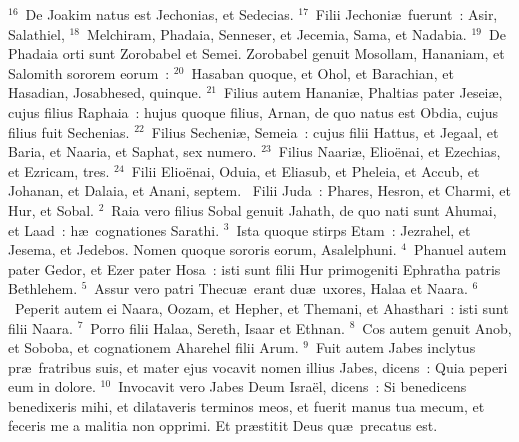 ${}^{16}$~De Joakim natus est Jechonias, et Sedecias.
${}^{17}$~Filii Jechoni\ae\ fuerunt~: Asir, Salathiel,
${}^{18}$~Melchiram, Phadaia, Senneser, et Jecemia, Sama, et Nadabia.
${}^{19}$~De Phadaia orti sunt Zorobabel et Semei. Zorobabel genuit Mosollam, Hananiam, et Salomith sororem eorum~:
${}^{20}$~Hasaban quoque, et Ohol, et Barachian, et Hasadian, Josabhesed, quinque.
${}^{21}$~Filius autem Hanani\ae , Phaltias pater Jesei\ae , cujus filius Raphaia~: hujus quoque filius, Arnan, de quo natus est Obdia, cujus filius fuit Sechenias.
${}^{22}$~Filius Secheni\ae , Semeia~: cujus filii Hattus, et Jegaal, et Baria, et Naaria, et Saphat, sex numero.
${}^{23}$~Filius Naari\ae , Elio\"enai, et Ezechias, et Ezricam, tres.
${}^{24}$~Filii Elio\"enai, Oduia, et Eliasub, et Pheleia, et Accub, et Johanan, et Dalaia, et Anani, septem.
~Filii Juda~: Phares, Hesron, et Charmi, et Hur, et Sobal.
${}^{2}$~Raia vero filius Sobal genuit Jahath, de quo nati sunt Ahumai, et Laad~: h\ae\ cognationes Sarathi.
${}^{3}$~Ista quoque stirps Etam~: Jezrahel, et Jesema, et Jedebos. Nomen quoque sororis eorum, Asalelphuni.
${}^{4}$~Phanuel autem pater Gedor, et Ezer pater Hosa~: isti sunt filii Hur primogeniti Ephratha patris Bethlehem.
${}^{5}$~Assur vero patri Thecu\ae\ erant du\ae\ uxores, Halaa et Naara.
${}^{6}$~Peperit autem ei Naara, Oozam, et Hepher, et Themani, et Ahasthari~: isti sunt filii Naara.
${}^{7}$~Porro filii Halaa, Sereth, Isaar et Ethnan.
${}^{8}$~Cos autem genuit Anob, et Soboba, et cognationem Aharehel filii Arum.
${}^{9}$~Fuit autem Jabes inclytus pr\ae\ fratribus suis, et mater ejus vocavit nomen illius Jabes, dicens~: Quia peperi eum in dolore.
${}^{10}$~Invocavit vero Jabes Deum Isra\"el, dicens~: Si benedicens benedixeris mihi, et dilataveris terminos meos, et fuerit manus tua mecum, et feceris me a malitia non opprimi. Et pr\ae stitit Deus qu\ae\ precatus est.


